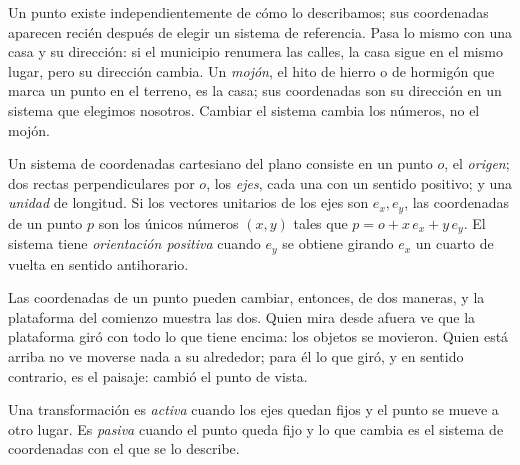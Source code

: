 Un punto existe independientemente de cómo lo describamos; sus coordenadas aparecen recién
después de elegir un sistema de referencia. Pasa lo mismo con una casa y su dirección: si el
municipio renumera las calles, la casa sigue en el mismo lugar, pero su dirección cambia. Un
\emph{mojón}, el hito de hierro o de hormigón que marca un punto en el terreno, es la casa;
sus coordenadas son su dirección en un sistema que elegimos nosotros. Cambiar el sistema cambia
los números, no el mojón.

\begin{definicion}
Un sistema de coordenadas cartesiano del plano consiste en un punto \(o\), el \emph{origen};
dos rectas perpendiculares por \(o\), los \emph{ejes}, cada una con un sentido positivo; y una
\emph{unidad} de longitud. Si los vectores unitarios de los ejes son \(e_x,e_y\), las
coordenadas de un punto \(p\) son los únicos números \((x,y)\) tales que
\(p=o+x\,e_x+y\,e_y\). El sistema tiene \emph{orientación positiva} cuando \(e_y\) se obtiene
girando \(e_x\) un cuarto de vuelta en sentido antihorario.
\end{definicion}

Las coordenadas de un punto pueden cambiar, entonces, de dos maneras, y la plataforma del
comienzo muestra las dos. Quien mira desde afuera ve que la plataforma giró con todo lo que
tiene encima: los objetos se movieron. Quien está arriba no ve moverse nada a su alrededor;
para él lo que giró, y en sentido contrario, es el paisaje: cambió el punto de vista.

\begin{definicion}
Una transformación es \emph{activa} cuando los ejes quedan fijos y el punto se mueve a otro
lugar. Es \emph{pasiva} cuando el punto queda fijo y lo que cambia es el sistema de
coordenadas con el que se lo describe.
\end{definicion}

\begin{center}
\end{center}

